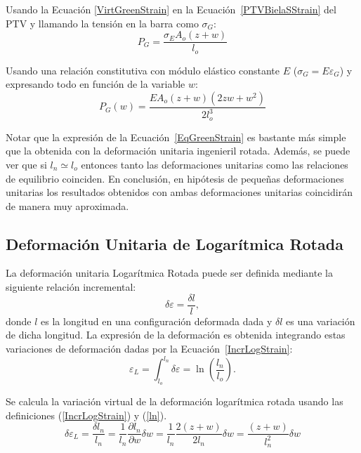 Usando la Ecuación \eqref{VirtGreenStrain} en la Ecuación~\eqref{PTVBielaSStrain} del PTV y llamando la tensión en la barra como $\sigma_G$:
%
\begin{equation}
	P_G = \frac{\sigma_EA_o(z+w)}{l_o}
\end{equation}

Usando una relación constitutiva con módulo elástico constante $E$ ($\sigma_G = E \varepsilon_G$) y expresando todo en función de la variable $w$:
%
\begin{equation}\label{EqGreenStrain}
	\boxed{
		P_G(w) = \frac{EA_o(z+w)\left(2zw+w^2\right)}{2l_o^3}
	}
\end{equation}

Notar que la expresión de la Ecuación~\eqref{EqGreenStrain} es bastante más simple que la obtenida con la deformación unitaria ingenieril rotada. Además, se puede ver que si $l_n\simeq l_o$ entonces tanto las deformaciones unitarias como las relaciones de equilibrio coinciden. En conclusión, en hipótesis de pequeñas deformaciones unitarias los resultados obtenidos con ambas deformaciones unitarias coincidirán de manera muy aproximada.

\subsection{Deformación Unitaria de Logarítmica Rotada}

La deformación unitaria Logarítmica Rotada puede ser definida mediante la siguiente relación incremental:
%
\begin{equation}\label{IncrLogStrain}
	\delta \varepsilon = \frac{\delta l}{l},
\end{equation}
%
donde $l$ es la longitud en una configuración deformada dada y $\delta l$ es una variación de dicha longitud. %
La expresión de la deformación es obtenida integrando estas variaciones de deformación dadas por la Ecuación~\eqref{IncrLogStrain}:
%
\begin{equation}\label{LogStrain}
	\varepsilon_L = \int_{l_o}^{l_n}\delta \varepsilon = \ln\left(\frac{l_n}{l_o}\right).
\end{equation}


Se calcula la variación virtual de la deformación logarítmica rotada usando las definiciones (\ref{IncrLogStrain}) y (\ref{ln}).
%
\begin{equation}\label{VirtLogStrain}
	\delta \varepsilon_L = \frac{\delta l_n}{l_n} = \frac{1}{l_n}\frac{\partial l_n}{\partial w}\delta w = \frac{1}{l_n} \frac{2(z+w)}{2l_n}\delta w = \frac{(z+w)}{l_n^2}\delta w
\end{equation}

